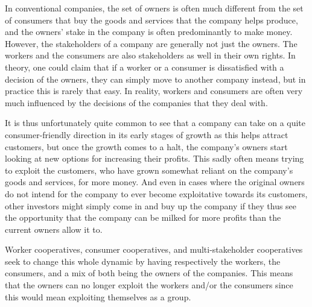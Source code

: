 \documentclass{article}
\begin{document}
In conventional companies, the set of owners is often much different from the set of consumers that buy the goods and services that the company helps produce, and the owners' stake in the company is often predominantly to make money. However, the stakeholders of a company are generally not just the owners. The workers and the consumers are also stakeholders as well in their own rights.
In theory, one could claim that if a worker or a consumer is dissatisfied with a decision of the owners, they can simply move to another company instead, but in practice this is rarely that easy. In reality, workers and consumers are often very much influenced by the decisions of the companies that they deal with. 
%

It is thus unfortunately quite common to see that a company can take on a quite consumer-friendly direction in its early stages of growth as this helps attract customers, but once the growth comes to a halt, the company's owners start looking at new options for increasing their profits. This sadly often means trying to exploit the customers, who have grown somewhat reliant on the company's goods and services, for more money. And even in cases where the original owners do not intend for the company to ever become exploitative towards its customers, other investors might simply come in and buy up the company if they thus see the opportunity that the company can be milked for more profits than the current owners allow it to.



Worker cooperatives, consumer cooperatives, and multi-stakeholder cooperatives seek to change this whole dynamic by having respectively the workers, the consumers, and a mix of both being the owners of the companies. This means that the owners can no longer exploit the workers and/or the consumers since this would mean exploiting themselves as a group. 
\end{document}

